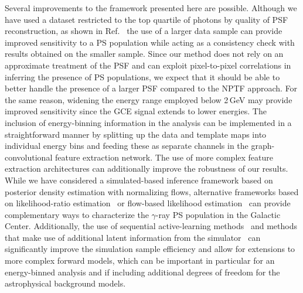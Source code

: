 \documentclass[prd,aps,10pt,nofootinbib,twocolumn,superscriptaddress,preprintnumbers,balancelastpage,longbibliography,floatfix]{revtex4-2}
\begin{document}
Several improvements to the framework presented here are possible. Although we have used a dataset restricted to the top quartile of photons by quality of PSF reconstruction, as shown in Ref.~\cite{Leane:2020pfc} the use of a larger data sample can provide improved sensitivity to a PS population while acting as a consistency check with results obtained on the smaller sample. Since our method does not rely on an approximate treatment of the PSF and can exploit pixel-to-pixel correlations in inferring the presence of PS populations, we expect that it should be able to better handle the presence of a larger PSF compared to the NPTF approach. For the same reason, widening the energy range employed below 2\,GeV may provide improved sensitivity since the GCE signal extends to lower energies. The inclusion of energy-binning information in the analysis can be implemented in a straightforward manner by splitting up the data and template maps into individual energy bins and feeding these as separate channels in the graph-convolutional feature extraction network. The use of more complex feature extraction architectures can additionally improve the robustness of our results. 
While we have considered a simulated-based inference framework based on posterior density estimation with normalizing flows, alternative frameworks based on likelihood-ratio estimation~\cite{Brehmer:2018eca,Brehmer:2018hga,Brehmer:2018kdj,Cranmer:2015bka, Hermans:2019ioj,Miller:2020hua,Miller:2021hys} or flow-based likelihood estimation~\cite{2019arXiv191200042W,pmlr-v89-papamakarios19a} can provide complementary ways to characterize the $\gamma$-ray PS population in the Galactic Center. Additionally, the use of sequential active-learning methods~\cite{pmlr-v89-papamakarios19a} and methods that make use of additional latent information from the simulator~\cite{Brehmer:2018eca,Brehmer:2018hga,Brehmer:2018kdj,Brehmer:2019xox,Stoye:2018ovl} can significantly improve the simulation sample efficiency and allow for extensions to more complex forward models, which can be important in particular for an energy-binned analysis and if including additional degrees of freedom for the astrophysical background models. 
\end{document}
